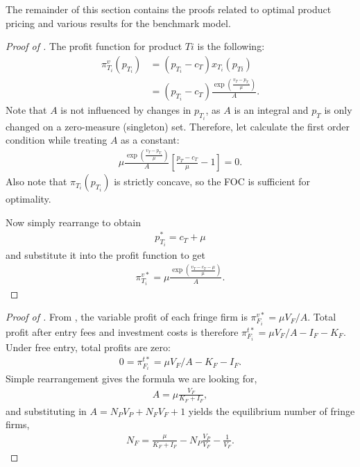 \documentclass[a4paper]{article}
\begin{document}
The remainder of this section contains the proofs related to optimal product pricing and various results for the benchmark model.

\begin{proof}[Proof of ]
    The profit function for product $Ti$ is the following:
    \begin{align*}
        \pi^v_{T_i}(p_{T_i}) &= (p_{T_i} - c_T) x_{T_i}(p_{Ti}) \\
        &= (p_{T_i} - c_T) \frac{\exp\left( \frac{v_T - p_{T_i}}{\mu} \right)}{A}.
    \end{align*}
    Note that $A$ is not influenced by changes in $p_{T_i}$, as $A$ is an integral and $p_T$ is only changed on a zero-measure (singleton) set.
    Therefore, let calculate the first order condition while treating $A$ as a constant:
    \begin{align}
        \mu \frac{\exp\left( \frac{v_T - p_{T_i}}{\mu} \right)}{A} \left[ \frac{p_T - c_T}{\mu} - 1 \right] = 0.
        \label{eq:foc_profit}
    \end{align}
    Also note that $\pi_{T_i}(p_{T_i})$ is strictly concave, so the FOC is sufficient for optimality.

    Now simply rearrange  to obtain
    \begin{align*}
        p_{T_i}^* = c_T + \mu
    \end{align*}
    and substitute it into the profit function to get
    \begin{align*}
        \pi_{T_i}^{v*} = \mu \frac{\exp \left( \frac{v_T - c_T - \mu}{\mu} \right)}{A}.
    \end{align*}
\end{proof}

\begin{proof}[Proof of ]
    From , the variable profit of each fringe firm is $\pi_{F_i}^{v*} = \mu V_F / A$.
    Total profit after entry fees and investment costs is therefore $\pi_{F_i}^{t*} = \mu V_F / A - I_F - K_F$.
    Under free entry, total profits are zero:
    \begin{align*}
        0 = \pi_{F_i}^{t*} = \mu V_F / A - K_F - I_F.
    \end{align*}
    Simple rearrangement gives the formula we are looking for,
    \begin{align*}
        A = \mu \frac{V_F}{K_F + I_F},
    \end{align*}
    and substituting in $A = N_P V_P + N_F V_F + 1$ yields the equilibrium number of fringe firms,
    \begin{align*}
        N_F = \frac{\mu}{K_F + I_F} - N_P \frac{V_P}{V_F} - \frac{1}{V_F}.
    \end{align*}
\end{proof}
\end{document}
